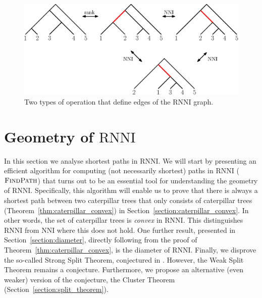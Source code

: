 \documentclass{amsart}
\newcommand{\nni}{\mathrm{NNI}}
\newcommand{\rnni}{\mathrm{RNNI}}
\newcommand{\findpath}{\textsc{FindPath}}
\begin{document}
\begin{figure}[H]
	\centering
	\includegraphics[width=\textwidth]{RNNI}
	\caption{Two types of operation that define edges of the $\rnni$ graph.}
	\label{fig:RNNI}
\end{figure}



\section{Geometry of $\rnni$}
\label{section:geometry}

In this section we analyse shortest paths in $\rnni$.
We will start by presenting an efficient algorithm for computing (not necessarily shortest) paths in $\rnni$ ($\findpath$) that turns out to be an essential tool for understanding the geometry of $\rnni$.
Specifically, this algorithm will enable us to prove that there is always a shortest path between two caterpillar trees that only consists of caterpillar trees (Theorem~\ref{thm:caterpillar_convex}) in Section~\ref{section:caterpillar_convex}.
In other words, the set of caterpillar trees is \emph{convex} in $\rnni$.
This distinguishes $\rnni$ from $\nni$ where this does not hold.
One further result, presented in Section~\ref{section:diameter}, directly following from the proof of Theorem~\ref{thm:caterpillar_convex}, is the diameter of $\rnni$.
Finally, we disprove the so-called Strong Split Theorem, conjectured in \autocite{Gavryushkin2018-ol}.
However, the Weak Split Theorem remains a conjecture.
Furthermore, we propose an alternative (even weaker) version of the conjecture, the Cluster Theorem (Section~\ref{section:split_theorem}).
\end{document}
